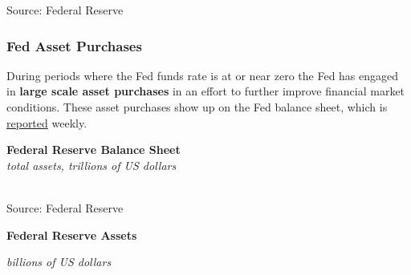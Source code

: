 \documentclass{report}
\makeatletter
\newcommand{\tbllink}[1]{\href{https://raw.githubusercontent.com/bdecon/US-chartbook/master/chartbook/data/#1}{\faTable}}
\newcommand*\short[1]{\expandafter\@gobbletwo\number\numexpr#1\relax}
\newcommand{\dateaxisticks}{
		date coordinates in=x, axis line style={draw=none},
		xmax={2023-10-01},
		max space between ticks=40,	    
		xtick={{1990-01-01}, {1992-01-01}, {1994-01-01}, 
			{1996-01-01}, {1998-01-01}, {2000-01-01}, 
			{2002-01-01}, {2004-01-01}, {2006-01-01},
			{2008-01-01}, {2010-01-01}, {2012-01-01}, {2014-01-01},
		    {2016-01-01}, {2018-01-01}, {2020-01-01}, {2022-01-01}, 
		    {2024-01-01}, {2026-01-01}},
		minor xtick={{1989-01-01}, {1991-01-01}, {1993-01-01},
			{1995-01-01}, {1997-01-01}, {1999-01-01}, 
			{2001-01-01}, {2003-01-01}, {2005-01-01}, {2007-01-01},
		    {2009-01-01}, {2011-01-01}, {2013-01-01}, {2015-01-01},
		    {2017-01-01}, {2019-01-01}, {2021-01-01}, {2023-01-01}, 
		    {2025-01-01}, {2027-01-01}},
		enlarge y limits={0.06}, enlarge x limits={0.01},
		}
\newcommand{\bbar}[2]{extra #1 ticks = {{#2}}, extra #1 tick labels = ,
		extra #1 tick style = {grid=major, grid style={thick, black!25}},}
\newcommand{\stdline}[4]{\addplot[very thick, no markers, color=#1] 
		table [x=#2, y=#3, col sep=comma] {#4};	}
\newcommand{\recbars}{
		\fill[color=black!10] (axis cs:{2007-12-01},\pgfkeysvalueof{/pgfplots/ymin}) rectangle 
			(axis cs:{2009-07-01}, \pgfkeysvalueof{/pgfplots/ymax});
		\fill[color=black!10] (axis cs:{2020-02-01},\pgfkeysvalueof{/pgfplots/ymin}) rectangle 
			(axis cs:{2020-05-01}, \pgfkeysvalueof{/pgfplots/ymax});}
\makeatother
\begin{document}
{\begin{minipage}{0.76\textwidth}
\footnotesize{Source: Federal Reserve} \hfill \tbllink{m2.csv}
\end{minipage}
\newpage
\begin{minipage}{0.76\textwidth}
\subsubsection*{Fed Asset Purchases}  
\small During periods where the Fed funds rate is at or near zero the Fed has engaged in \textbf{large scale asset purchases} in an effort to further improve financial market conditions. These asset purchases show up on the Fed balance sheet, which is \href{https://www.federalreserve.gov/releases/h41/current/default.htm}{reported} weekly. 




\end{minipage}

\begin{minipage}{0.415\textwidth} 
\normalsize \textbf{Federal Reserve Balance Sheet}\\
\footnotesize{\textit{total assets, trillions of US dollars}}\\
\hspace*{-2mm} \\
\footnotesize{Source: Federal Reserve} \hfill \tbllink{fed_assets.csv}
\end{minipage}\hspace{6mm}
\begin{minipage}{0.3\textwidth}
\small 
\end{minipage}
\vspace{7mm}

\begin{minipage}{0.76\textwidth}
\normalsize \textbf{Federal Reserve Assets}\\
\footnotesize{\textit{billions of US dollars}
\vspace*{-5mm}

}
\end{minipage}}
\end{document}
